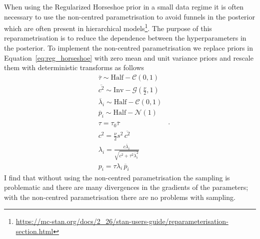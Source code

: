 \documentclass[12pt,dvipsnames]{report}
\newcommand{\hquad}{~~}
\begin{document}
When using the Regularized Horseshoe prior in a small data regime it is often necessary to use the non-centred parametrisation to avoid funnels in the posterior which are often present in hierarchical models\footnote{\url{https://mc-stan.org/docs/2_26/stan-users-guide/reparameterisation-section.html}}.
The purpose of this reparametrisation is to reduce the dependence between the hyperparameters in the posterior.
To implement the non-centred parametrisation we replace priors in Equation~\ref{eq:reg_horseshoe} with zero mean and unit variance priors and rescale them with deterministic transforms as follows
\begin{equation}
\begin{aligned}
    &\overline{\tau} \sim \mathrm{Half}-\mathcal{C}\left(0, 1\right)\\
    &\overline{c^{2}}  \sim \mathrm{Inv}-\mathcal{G}\left(\frac{\nu}{2}, 1\right) \\
    &\overline{\lambda}_{i}  \sim \mathrm{Half}-\mathcal{C}(0,1) \\
    &\overline{p}_{i}  \sim \mathrm{Half}-\mathcal{N}\left(1\right)\\
    &\tau=\tau_0\overline{\tau}\\
    &c^2=\frac{\nu}{2}s^2\,\overline{c^2}\\
    &\lambda_{i} =\frac{c \overline{\lambda}_{i}}{\sqrt{c^{2}+\tau^{2} \overline{\lambda}_{i}^{2}}} \\
    &p_i = \tau\lambda_i\,\overline{p}_i
\end{aligned}
\hquad.
    \label{eq:reg_horseshoe_noncentred}
\end{equation}
I find that without using the non-centred parametrisation the sampling is problematic and there are many divergences in the gradients of the parameters; with the non-centred parametrisation there are no problems with sampling.




\end{document}
